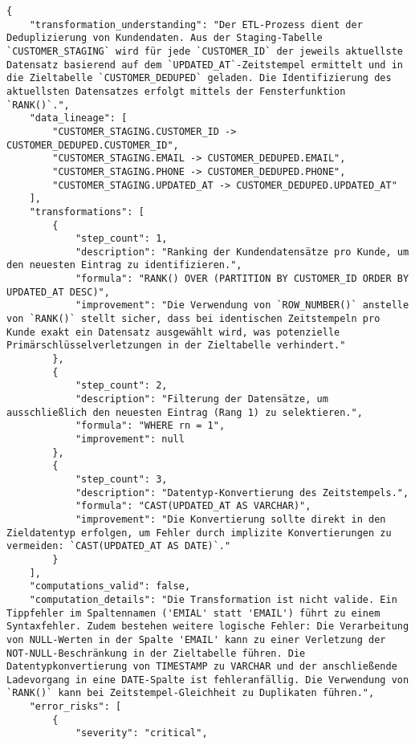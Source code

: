 \begin{lstlisting}[caption={Ausgabe: GEMINI 2.5 Pro Anwendungsfall 2 Robustheitsdurchlauf},label={gemini_case2_prompt3}]
{
    "transformation_understanding": "Der ETL-Prozess dient der Deduplizierung von Kundendaten. Aus der Staging-Tabelle `CUSTOMER_STAGING` wird für jede `CUSTOMER_ID` der jeweils aktuellste Datensatz basierend auf dem `UPDATED_AT`-Zeitstempel ermittelt und in die Zieltabelle `CUSTOMER_DEDUPED` geladen. Die Identifizierung des aktuellsten Datensatzes erfolgt mittels der Fensterfunktion `RANK()`.",
    "data_lineage": [
        "CUSTOMER_STAGING.CUSTOMER_ID -> CUSTOMER_DEDUPED.CUSTOMER_ID",
        "CUSTOMER_STAGING.EMAIL -> CUSTOMER_DEDUPED.EMAIL",
        "CUSTOMER_STAGING.PHONE -> CUSTOMER_DEDUPED.PHONE",
        "CUSTOMER_STAGING.UPDATED_AT -> CUSTOMER_DEDUPED.UPDATED_AT"
    ],
    "transformations": [
        {
            "step_count": 1,
            "description": "Ranking der Kundendatensätze pro Kunde, um den neuesten Eintrag zu identifizieren.",
            "formula": "RANK() OVER (PARTITION BY CUSTOMER_ID ORDER BY UPDATED_AT DESC)",
            "improvement": "Die Verwendung von `ROW_NUMBER()` anstelle von `RANK()` stellt sicher, dass bei identischen Zeitstempeln pro Kunde exakt ein Datensatz ausgewählt wird, was potenzielle Primärschlüsselverletzungen in der Zieltabelle verhindert."
        },
        {
            "step_count": 2,
            "description": "Filterung der Datensätze, um ausschließlich den neuesten Eintrag (Rang 1) zu selektieren.",
            "formula": "WHERE rn = 1",
            "improvement": null
        },
        {
            "step_count": 3,
            "description": "Datentyp-Konvertierung des Zeitstempels.",
            "formula": "CAST(UPDATED_AT AS VARCHAR)",
            "improvement": "Die Konvertierung sollte direkt in den Zieldatentyp erfolgen, um Fehler durch implizite Konvertierungen zu vermeiden: `CAST(UPDATED_AT AS DATE)`."
        }
    ],
    "computations_valid": false,
    "computation_details": "Die Transformation ist nicht valide. Ein Tippfehler im Spaltennamen ('EMIAL' statt 'EMAIL') führt zu einem Syntaxfehler. Zudem bestehen weitere logische Fehler: Die Verarbeitung von NULL-Werten in der Spalte 'EMAIL' kann zu einer Verletzung der NOT-NULL-Beschränkung in der Zieltabelle führen. Die Datentypkonvertierung von TIMESTAMP zu VARCHAR und der anschließende Ladevorgang in eine DATE-Spalte ist fehleranfällig. Die Verwendung von `RANK()` kann bei Zeitstempel-Gleichheit zu Duplikaten führen.",
    "error_risks": [
        {
            "severity": "critical",

\end{lstlisting}
